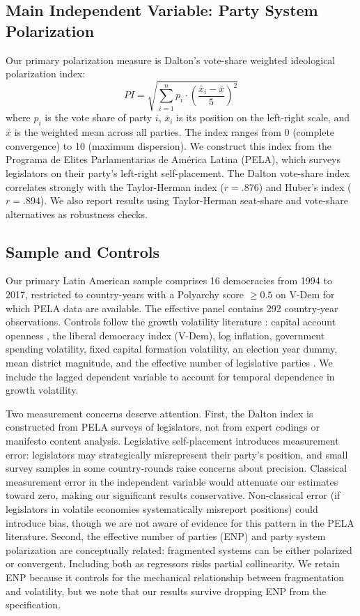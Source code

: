 \documentclass[12pt]{article}
\begin{document}
\subsection{Main Independent Variable: Party System Polarization}

Our primary polarization measure is Dalton's \citeyearpar{Dalton2008}
vote-share weighted ideological polarization index:
\[
\textstyle PI = \sqrt{\sum_{i=1}^{n} p_i \cdot \left(\frac{\bar{x}_i - \bar{x}}{5}\right)^2}
\]
where $p_i$ is the vote share of party $i$, $\bar{x}_i$ is its position on
the left-right scale, and $\bar{x}$ is the weighted mean across all parties.
The index ranges from 0 (complete convergence) to 10 (maximum dispersion).
We construct this index from the Programa de Elites Parlamentarias de
Am\'{e}rica Latina (PELA), which surveys legislators on their party's
left-right self-placement. The Dalton vote-share index correlates strongly
with the Taylor-Herman index ($r = .876$) and Huber's index ($r = .894$).
We also report results using Taylor-Herman seat-share and vote-share
alternatives as robustness checks.

\subsection{Sample and Controls}

Our primary Latin American sample comprises 16 democracies from 1994 to 2017,
restricted to country-years with a Polyarchy score $\geq 0.5$ on V-Dem for
which PELA data are available. The effective panel contains 292 country-year
observations. Controls follow the growth volatility literature
\citep{Easterly2000, BejarMukherjee2011, Mathonnat2018}: capital account
openness \citep{ChinnIto}, the liberal democracy index (V-Dem), log
inflation, government spending volatility, fixed capital formation volatility,
an election year dummy, mean district magnitude, and the effective number of
legislative parties \citep{Schmidt}. We include the lagged dependent variable
to account for temporal dependence in growth volatility.

Two measurement concerns deserve attention. First, the Dalton index is
constructed from PELA surveys of legislators, not from expert codings or
manifesto content analysis. Legislative self-placement introduces
measurement error: legislators may strategically misrepresent their party's
position, and small survey samples in some country-rounds raise concerns
about precision. Classical measurement error in the independent variable
would attenuate our estimates toward zero, making our significant results
conservative. Non-classical error (if legislators in volatile economies
systematically misreport positions) could introduce bias, though we are not
aware of evidence for this pattern in the PELA literature. Second, the
effective number of parties (ENP) and party system polarization are
conceptually related: fragmented systems can be either polarized or
convergent. Including both as regressors risks partial collinearity.
We retain ENP because it controls for the mechanical relationship between
fragmentation and volatility, but we note that our results survive
dropping ENP from the specification.
\end{document}
